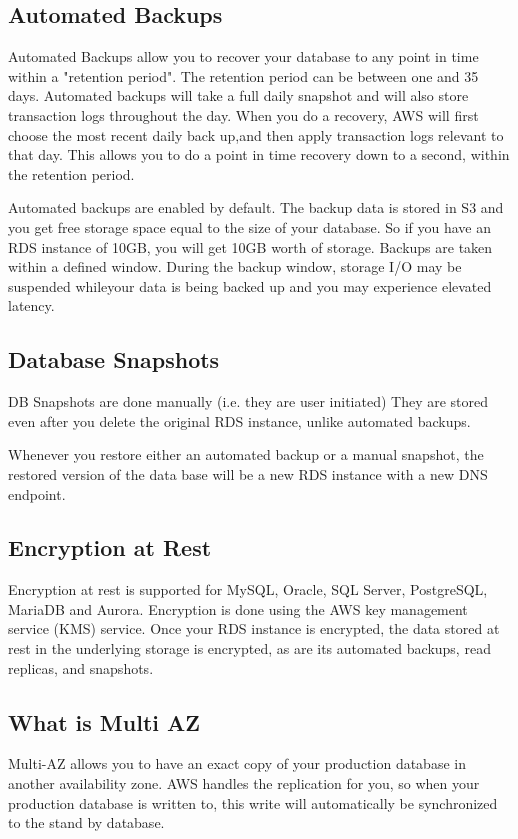 \documentclass{article}
\begin{document}
\subsection{Automated Backups}
Automated Backups allow you to recover your database to any point in time within a "retention period". The retention period can be between one and 35 days. Automated backups will take a full daily snapshot and will also store transaction logs throughout the day. When you do a recovery, AWS will first choose the most recent daily back up,and then apply transaction logs relevant to that day. This allows you to do a point in time recovery down to a second, within the retention period.

Automated backups are enabled by default. The backup data is stored in S3 and you get free storage space equal to the size of your database. So if you have an RDS instance of 10GB, you will get 10GB worth of storage. Backups are taken within a defined window. During the backup window, storage I/O may be suspended whileyour data is being backed up and you may experience elevated latency.

\subsection{Database Snapshots}
DB Snapshots are done manually (i.e. they are user initiated) They are stored even after you delete the original RDS instance, unlike automated backups.

Whenever you restore either an automated backup or a manual snapshot, the restored version of the data base will be a new RDS instance with a new DNS endpoint.

\subsection{Encryption at Rest}
Encryption at rest is supported for MySQL, Oracle, SQL Server, PostgreSQL, MariaDB and Aurora. Encryption is done using the AWS key management service (KMS) service. Once your RDS instance is encrypted, the data stored at rest in the underlying storage is encrypted, as are its automated backups, read replicas, and snapshots.

\subsection{What is Multi AZ}
Multi-AZ allows you to have an exact copy of your production database in another availability zone. AWS handles the replication for you, so when your production database is written to, this write will automatically be synchronized to the stand by database.
\end{document}
